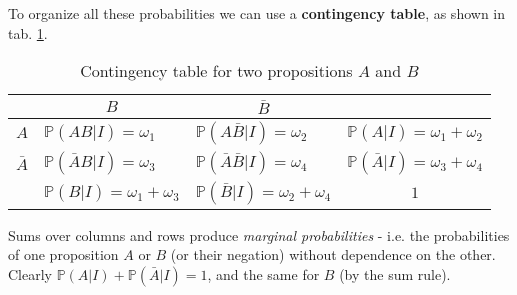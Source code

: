 \documentclass[../template.tex]{subfiles}
\begin{document}
\begin{exo}
    \medskip

    To organize all these probabilities we can use a \textbf{contingency table}, as shown in tab. \ref{tab:contingency}.  
\begin{table}[H]
    \centering
    \begin{tabular}{@{}r|ll|c@{}}
    \multicolumn{1}{c|}{} & \multicolumn{1}{c}{$B$}    & \multicolumn{1}{c|}{$\bar{B}$} & \multicolumn{1}{c}{}       \\ \midrule
    $A$                   & $\mathbb{P}(AB|I)=\omega_1$           & $\mathbb{P}(A\bar{B}|I) = \omega_2$       & $\mathbb{P}(A|I)=\omega_1+\omega_2$ \\
    $\bar{A}$             & $\mathbb{P}(\bar{A}B|I) = \omega_3$ & $\mathbb{P}(\bar{A}\bar{B}|I)=\omega_4$ & $\mathbb{P}(\bar{A}|I)=\omega_3+\omega_4$ \\ \midrule
    \multicolumn{1}{l|}{} & $\mathbb{P}(B|I) = \omega_1+\omega_3$ & $\mathbb{P}(\bar{B}|I)=\omega_2+\omega_4$ & $1$                       
    \end{tabular}
    \caption{Contingency table for two propositions $A$ and $B$}
    \label{tab:contingency}
    \end{table}

    Sums over columns and rows produce \textit{marginal probabilities} - i.e. the probabilities of one proposition $A$ or $B$ (or their negation) without dependence on the other. Clearly $\mathbb{P}(A|I) + \mathbb{P}(\bar{A}|I) = 1$, and the same for $B$ (by the sum rule).

    \medskip


\end{exo}
\end{document}
